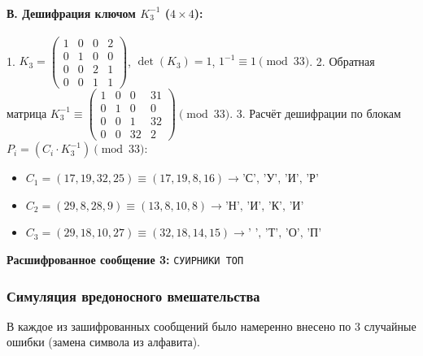 \paragraph{В. Дешифрация ключом $K_3^{-1}$ ($4\times4$):}
1. $K_3 = \begin{pmatrix} 1 & 0 & 0 & 2 \\ 0 & 1 & 0 & 0 \\ 0 & 0 & 2 & 1 \\ 0 & 0 & 1 & 1 \end{pmatrix}$, $\det(K_3) = 1$, $1^{-1} \equiv 1 \pmod{33}$.
2. Обратная матрица $K_3^{-1} \equiv \begin{pmatrix} 1 & 0 & 0 & 31 \\ 0 & 1 & 0 & 0 \\ 0 & 0 & 1 & 32 \\ 0 & 0 & 32 & 2 \end{pmatrix} \pmod{33}$.
3. Расчёт дешифрации по блокам $P_i = (C_i \cdot K_3^{-1}) \pmod{33}$:
   \begin{itemize}
       \item $C_1 = (17, 19, 32, 25) \equiv (17, 19, 8, 16) \rightarrow \text{'С', 'У', 'И', 'Р'}$
       \item $C_2 = (29, 8, 28, 9) \equiv (13, 8, 10, 8) \rightarrow \text{'Н', 'И', 'К', 'И'}$
       \item $C_3 = (29, 18, 10, 27) \equiv (32, 18, 14, 15) \rightarrow \text{' ', 'Т', 'О', 'П'}$
   \end{itemize}
\textbf{Расшифрованное сообщение 3:} \texttt{СУИРНИКИ ТОП}

\subsubsection{Симуляция вредоносного вмешательства}
В каждое из зашифрованных сообщений было намеренно внесено по 3 случайные ошибки (замена символа из алфавита).

